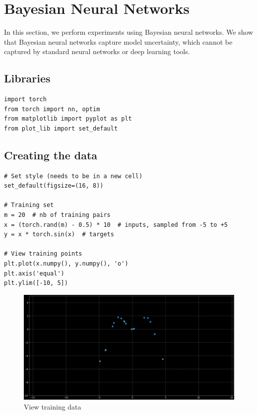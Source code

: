 \chapter{Bayesian Neural Networks}

In this section, we perform experiments using Bayesian neural networks. We show that Bayesian neural networks capture model uncertainty, which cannot be captured by standard neural networks or deep learning tools. 

\section{Libraries}

\begin{verbatim}
import torch
from torch import nn, optim
from matplotlib import pyplot as plt
from plot_lib import set_default
\end{verbatim}

\section{Creating the data}
\begin{verbatim}
# Set style (needs to be in a new cell)
set_default(figsize=(16, 8))

# Training set
m = 20  # nb of training pairs
x = (torch.rand(m) - 0.5) * 10  # inputs, sampled from -5 to +5
y = x * torch.sin(x)  # targets

# View training points
plt.plot(x.numpy(), y.numpy(), 'o')
plt.axis('equal')
plt.ylim([-10, 5])
\end{verbatim}

\begin{figure}[H]
    \centering
    \includegraphics[width=\textwidth]{labs/12/images/exp_1.png}
    \caption{View training data}
    \label{fig:training_data}
\end{figure}

